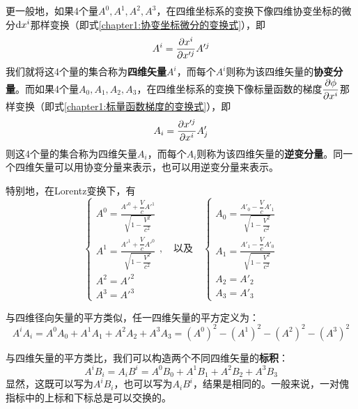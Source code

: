 更一般地，如果4个量$A^0,A^1,A^2,A^3$，在四维坐标系的变换下像四维协变坐标的微分$\mathrm{d} x^i$那样变换（即式\eqref{chapter1:协变坐标微分的变换式}），即
\begin{equation}
	A^i = \frac{\partial x^i}{\partial x'^j} A'^j
	\label{chapter1:四维矢量协变分量的变换关系式}
\end{equation}
我们就将这4个量的集合称为{\bf 四维矢量}$A^i$，而每个$A^i$则称为该四维矢量的{\bf 协变分量}。而如果4个量$A_0,A_1,A_2,A_3$，在四维坐标系的变换下像标量函数的梯度$\dfrac{\partial \phi}{\partial x^i}$那样变换（即式\eqref{chapter1:标量函数梯度的变换式}），即
\begin{equation}
	A_i = \frac{\partial x'^j}{\partial x^i} A'_j
	\label{chapter1:四维矢量逆变分量的变换关系式}
\end{equation}
则这4个量的集合称为四维矢量$A_i$，而每个$A_i$则称为该四维矢量的{\bf 逆变分量}。同一个四维矢量可以用协变分量来表示，也可以用逆变分量来表示。

特别地，在Lorentz变换下，有
\begin{equation}
\begin{cases}
	\displaystyle A^0 = \frac{A'^0+\dfrac{V}{c}A'^1}{\sqrt{1-\dfrac{V^2}{c^2}}} \\[1.5ex]
	\displaystyle A^1 = \frac{A'^1+\dfrac{V}{c}A'^0}{\sqrt{1-\dfrac{V^2}{c^2}}} \\[1.5ex]
	A^2 = A'^2 \\[1.5ex]
	A^3 = A'^3 
\end{cases},\quad \text{以及}\quad
\begin{cases}
	\displaystyle A_0 = \frac{A'_0-\dfrac{V}{c}A'_1}{\sqrt{1-\dfrac{V^2}{c^2}}} \\[1.5ex]
	\displaystyle A_1 = \frac{A'_1-\dfrac{V}{c}A'_0}{\sqrt{1-\dfrac{V^2}{c^2}}} \\[1.5ex]
	A_2 = A'_2 \\[1.5ex]
	A_3 = A'_3 
\end{cases}
\end{equation}

与四维径向矢量的平方类似，任一四维矢量的平方定义为：
\begin{equation*}
	A^iA_i = A^0A_0 + A^1A_1 + A^2A_2 + A^3A_3 = (A^0)^2-(A^1)^2-(A^2)^2-(A^3)^2
\end{equation*}

与四维矢量的平方类比，我们可以构造两个不同四维矢量的{\bf 标积}：
\begin{equation*}
	A^iB_i = A_iB^i = A^0B_0+A^1B_1+A^2B_2+A^3B_3
\end{equation*}
显然，这既可以写为$A^iB_i$，也可以写为$A_iB^i$，结果是相同的。一般来说，一对傀指标中的上标和下标总是可以交换的。

